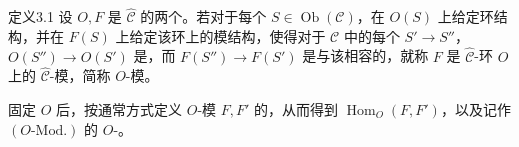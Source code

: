 \begin{SGAresult}{定义}{3.1}
设 $O,F$ 是 $\widehat{\mathcal C}$ 的两个。若对于每个 $S\in\operatorname{Ob}(\mathcal C)$，在 $O(S)$ 上给定环结构，并在 $F(S)$ 上给定该环上的模结构，使得对于 $\mathcal C$ 中的每个 $S'\to S''$，$O(S'')\to O(S')$ 是，而 $F(S'')\to F(S')$ 是与该相容的，就称 $F$ 是 $\widehat{\mathcal C}$-环 $O$ 上的 $\widehat{\mathcal C}$-模，简称 $O$-模。
\end{SGAresult}
固定 $O$ 后，按通常方式定义 $O$-模 $F,F'$ 的，从而得到 $\operatorname{Hom}_O(F,F')$，以及记作 $(O\text{-}\mathrm{Mod.})$ 的 $O$-。

